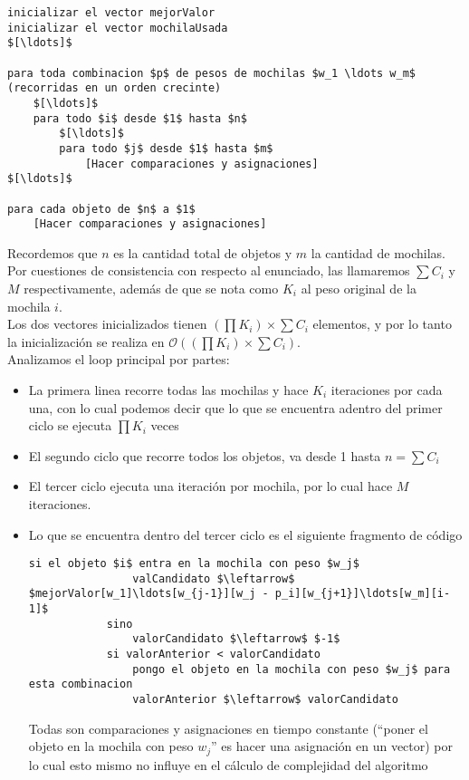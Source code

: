 \begin{lstlisting}
inicializar el vector mejorValor
inicializar el vector mochilaUsada
$[\ldots]$

para toda combinacion $p$ de pesos de mochilas $w_1 \ldots w_m$ (recorridas en un orden crecinte)
	$[\ldots]$
	para todo $i$ desde $1$ hasta $n$
		$[\ldots]$
		para todo $j$ desde $1$ hasta $m$
			[Hacer comparaciones y asignaciones]
$[\ldots]$

para cada objeto de $n$ a $1$
	[Hacer comparaciones y asignaciones]

\end{lstlisting}

Recordemos que $n$ es la cantidad total de objetos y $m$ la cantidad de mochilas. Por cuestiones de consistencia con respecto al enunciado, las llamaremos $\sum C_i$ y $M$ respectivamente, además de que se nota como $K_i$ al peso original de la mochila $i$.
\\

Los dos vectores inicializados tienen $(\prod K_i) \times \sum C_i$ elementos, y por lo tanto la inicialización se realiza en $\mathcal{O}((\prod K_i) \times \sum C_i)$.
\\

Analizamos el loop principal por partes:

\begin{itemize}
\item La primera linea recorre todas las mochilas y hace $K_i$ iteraciones por cada una, con lo cual podemos decir que lo que se encuentra adentro del primer ciclo se ejecuta $\prod K_i$ veces

\item El segundo ciclo que recorre todos los objetos, va desde 1 hasta $n = \sum C_i$

\item El tercer ciclo ejecuta una iteración por mochila, por lo cual hace $M$ iteraciones.

\item Lo que se encuentra dentro del tercer ciclo es el siguiente fragmento de código

\begin{lstlisting}
si el objeto $i$ entra en la mochila con peso $w_j$
				valCandidato $\leftarrow$ $mejorValor[w_1]\ldots[w_{j-1}][w_j - p_i][w_{j+1}]\ldots[w_m][i-1]$
			sino
				valorCandidato $\leftarrow$ $-1$
			si valorAnterior < valorCandidato
				pongo el objeto en la mochila con peso $w_j$ para esta combinacion
				valorAnterior $\leftarrow$ valorCandidato
\end{lstlisting}

Todas son comparaciones y asignaciones en tiempo constante (``poner el objeto en la mochila con peso $w_j$'' es hacer una asignación en un vector) por lo cual esto mismo no influye en el cálculo de complejidad del algoritmo
\end{itemize}

